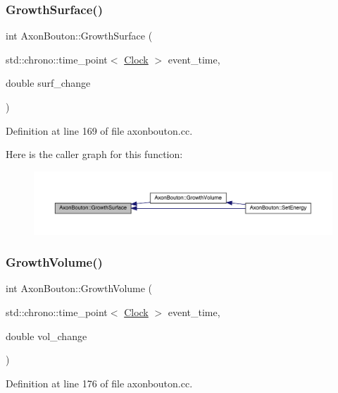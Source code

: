 \subsubsection{\texorpdfstring{Growth\+Surface()}{GrowthSurface()}}
{\footnotesize\ttfamily int Axon\+Bouton\+::\+Growth\+Surface (\begin{DoxyParamCaption}\item[{std\+::chrono\+::time\+\_\+point$<$ \hyperlink{universe_8h_a0ef8d951d1ca5ab3cfaf7ab4c7a6fd80}{Clock} $>$}]{event\+\_\+time,  }\item[{double}]{surf\+\_\+change }\end{DoxyParamCaption})}



Definition at line 169 of file axonbouton.\+cc.

Here is the caller graph for this function\+:
\nopagebreak
\begin{figure}[H]
\begin{center}
\leavevmode
\includegraphics[width=350pt]{class_axon_bouton_a95fc006b2436e2c7784af2cc0bc9522e_icgraph}
\end{center}
\end{figure}
\mbox{\label{class_axon_bouton_a10ac4446e777376a3944c87b2bcf26b5}} 
\subsubsection{\texorpdfstring{Growth\+Volume()}{GrowthVolume()}}
{\footnotesize\ttfamily int Axon\+Bouton\+::\+Growth\+Volume (\begin{DoxyParamCaption}\item[{std\+::chrono\+::time\+\_\+point$<$ \hyperlink{universe_8h_a0ef8d951d1ca5ab3cfaf7ab4c7a6fd80}{Clock} $>$}]{event\+\_\+time,  }\item[{double}]{vol\+\_\+change }\end{DoxyParamCaption})}



Definition at line 176 of file axonbouton.\+cc.

